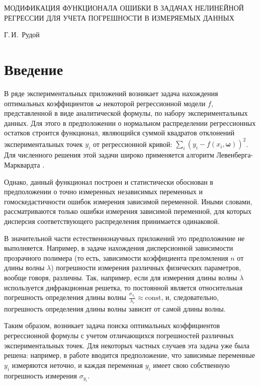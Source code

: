 \documentclass[11pt,a4paper]{article}
\begin{document}
\begin{center}
  МОДИФИКАЦИЯ ФУНКЦИОНАЛА ОШИБКИ В ЗАДАЧАХ НЕЛИНЕЙНОЙ РЕГРЕССИИ ДЛЯ УЧЕТА ПОГРЕШНОСТИ В ИЗМЕРЯЕМЫХ ДАННЫХ

  \bigskip
  Г.\,И.~Рудой
\end{center}

\section{Введение}

В ряде экспериментальных приложений возникает задача нахождения оптимальных
коэффициентов $\boldsymbol{\omega}$ некоторой регрессионной модели $f$, представленной в
виде аналитической формулы, по набору экспериментальных данных. Для этого
в предположении о нормальном распределении регрессионных остатков
строится функционал, являющийся суммой квадратов отклонений экспериментальных
точек $y_i$ от регрессионной кривой: $\sum_i (y_i - f(x_i, \boldsymbol{\omega}))^2$.
Для численного решения этой задачи широко применяется алгоритм Левенберга-Марквардта
\cite{Marquardt1963Algorithm}.

Однако, данный функционал построен и статистически обоснован в предположении
о точно измеренных независимых переменных и гомоскедастичности ошибок измерения
зависимой переменной. Иными словами, рассматриваются только ошибки измерения
зависимой переменной, для которых дисперсия соответствующего распределения
принимается одинаковой.

В значительной части естественнонаучных приложений это предположение не
выполняется. Например, в задаче нахождения дисперсионной зависимости прозрачного
полимера (то есть, зависимости коэффициента преломления $n$ от длины волны
$\lambda$) \cite{Rudoy15MonteCarlo} погрешности измерения
различных физических параметров, вообще говоря, различны. Так, например, если
для измерения длины волны $\lambda$ используется дифракционная решетка, то постоянной
является относительная погрешность определения длины волны
$\frac{\sigma_{\lambda_i}}{\lambda_i} \approx \text{const}$, и, следовательно,
погрешность определения длины волны зависит от самой длины волны.

Таким образом, возникает задача поиска оптимальных коэффициентов регрессионной
формулы с учетом отличающихся погрешностей различных экспериментальных точек.
Для некоторых частных случаев эта задача уже была решена: например, 
в работе \cite{jukic2013nonlinear} вводится предположение, что зависимые переменные $y_i$ измеряются
неточно, и каждая переменная $y_i$ имеет свою собственную погрешность измерения
$\sigma_{y_i}$.
\end{document}
